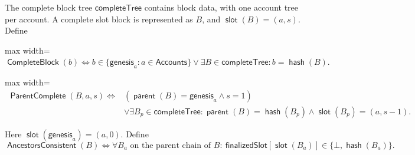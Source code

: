 \documentclass[sigplan,twocolumn,review,anonymous]{acmart}
\newcommand{\func}[1]{\operatorname{\mathsf{#1}}}
\newcommand{\hash}{\func{hash}}
\newcommand{\CompleteBlock}{\func{CompleteBlock}}
\newcommand{\ParentComplete}{\func{ParentComplete}}
\newcommand{\completeTree}{\mathsf{completeTree}}
\newcommand{\parent}{\func{parent}}
\newcommand{\slotOf}{\func{slot}}
\newcommand{\finalizedSlot}{\mathsf{finalizedSlot}}
\begin{document}
The complete block tree \(\completeTree\) contains block data, with one account tree per account.  A
complete slot block is represented as \(B\), and \(\slotOf(B)=(a,s)\).  Define
\begin{center}
\begin{adjustbox}{max width=\columnwidth}
\(\displaystyle
\CompleteBlock(b)\iff
b\in\{\mathsf{genesis}_a:a\in\mathsf{Accounts}\}\vee\exists B\in\completeTree:b=\hash(B).
\)
\end{adjustbox}
\end{center}
\begin{center}
\begin{adjustbox}{max width=\columnwidth}
\(\displaystyle
\begin{aligned}
\ParentComplete(B,a,s)
\iff{}& (\parent(B)=\mathsf{genesis}_{a}\wedge s=1)\\
&\vee\exists B_p\in\completeTree:
\parent(B)=\hash(B_p)\wedge\slotOf(B_p)=(a,s-1).
\end{aligned}
\)
\end{adjustbox}
\end{center}
Here \(\slotOf(\mathsf{genesis}_a)=(a,0)\).  Define
\[
\func{AncestorsConsistent}(B)\iff
\forall B_a\text{ on the parent chain of }B:\
\finalizedSlot[\slotOf(B_a)]\in\{\bot,\hash(B_a)\}.
\]
\end{document}
